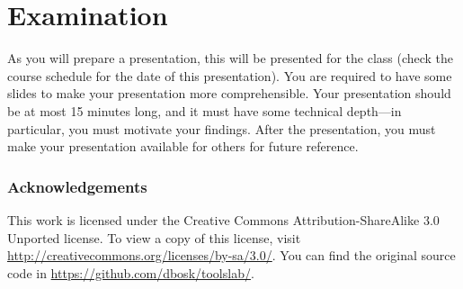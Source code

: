 \section{Examination}
\label{sec:exam}
As you will prepare a presentation, this will be presented for the class (check 
the course schedule for the date of this presentation).
You are required to have some slides to make your presentation more 
comprehensible.
Your presentation should be at most 15 minutes long, and it must have some 
technical depth---in particular, you must motivate your findings.
After the presentation, you must make your presentation available for others 
for future reference.


\subsubsection*{Acknowledgements}

This work is licensed under the Creative Commons Attribution-ShareAlike 3.0 
Unported license.
To view a copy of this license, visit 
\url{http://creativecommons.org/licenses/by-sa/3.0/}.
You can find the original source code in 
\url{https://github.com/dbosk/toolslab/}.


\printbibliography
